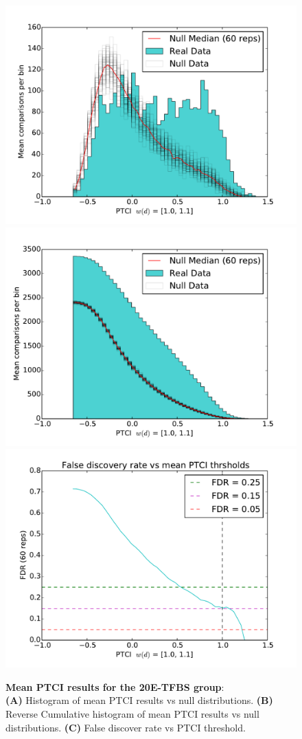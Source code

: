 
\begin{figure}[hp]
%
\subcaptionbox{\label{fig:ecr-mean-ptci-hists-base}}
{\includegraphics[width=.5\linewidth]{figures/figs/ecr_team_ptci_20130918_orthodb7/mean_ptci_hist.pdf}}
% 
\subcaptionbox{\label{fig:ecr-mean-ptci-hists-rcum-hist}}
{\includegraphics[width=.5\linewidth]{figures/figs/ecr_team_ptci_20130918_orthodb7/mean_ptci_cum_hist.pdf}}
% 
\subcaptionbox{\label{fig:ecr-mean-ptci-hists-fdr}}
{\includegraphics[width=.5\linewidth]{figures/figs/ecr_team_ptci_20130918_orthodb7/mean_ptci_fdr.pdf}}
% 
% 
\caption[Mean 20E-PTCI results]{\sf \textbf{Mean PTCI results for the \gls{20E}-\gls{TFBS} group}:\\
\textbf{(A)} Histogram of mean PTCI results vs null distributions.
\textbf{(B)} Reverse Cumulative histogram of mean PTCI results vs null distributions.
\textbf{(C)} False discover rate vs PTCI threshold.}
\label{fig:ecr-mean-ptci-hists}
\end{figure}